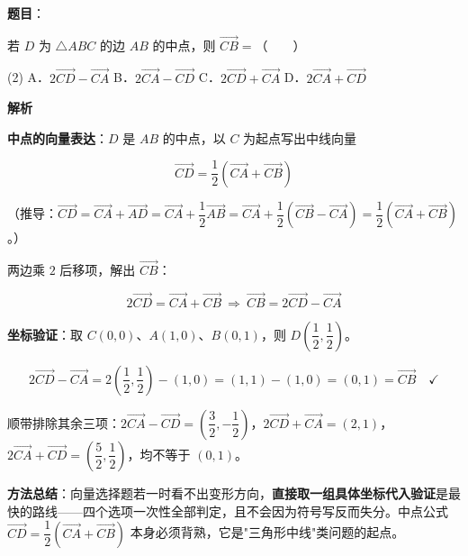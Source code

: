 \begin{answer}

\textbf{题目}：

若 $D$ 为 $\triangle ABC$ 的边 $AB$ 的中点，则 $\overrightarrow{CB}=$\mbox{（　　）}

\begin{gkopts}(2)
\task A．$2\overrightarrow{CD}-\overrightarrow{CA}$
\task B．$2\overrightarrow{CA}-\overrightarrow{CD}$
\task C．$2\overrightarrow{CD}+\overrightarrow{CA}$
\task D．$2\overrightarrow{CA}+\overrightarrow{CD}$
\end{gkopts}

\textbf{解析}

\textbf{中点的向量表达}：$D$ 是 $AB$ 的中点，以 $C$ 为起点写出中线向量

\nopagebreak[4]
\[\overrightarrow{CD}=\frac12\left(\overrightarrow{CA}+\overrightarrow{CB}\right)\]

（推导：$\overrightarrow{CD}=\overrightarrow{CA}+\overrightarrow{AD}=\overrightarrow{CA}+\dfrac12\overrightarrow{AB}=\overrightarrow{CA}+\dfrac12\left(\overrightarrow{CB}-\overrightarrow{CA}\right)=\dfrac12\left(\overrightarrow{CA}+\overrightarrow{CB}\right)$。）

两边乘 $2$ 后移项，解出 $\overrightarrow{CB}$：

\nopagebreak[4]
\[2\overrightarrow{CD}=\overrightarrow{CA}+\overrightarrow{CB}\ \Longrightarrow\ \overrightarrow{CB}=2\overrightarrow{CD}-\overrightarrow{CA}\]

\textbf{坐标验证}：取 $C(0,0)$、$A(1,0)$、$B(0,1)$，则 $D\left(\dfrac12,\dfrac12\right)$。

\nopagebreak[4]
\[2\overrightarrow{CD}-\overrightarrow{CA}=2\left(\frac12,\frac12\right)-(1,0)=(1,1)-(1,0)=(0,1)=\overrightarrow{CB}\quad\checkmark\]

顺带排除其余三项：$2\overrightarrow{CA}-\overrightarrow{CD}=\left(\dfrac32,-\dfrac12\right)$，$2\overrightarrow{CD}+\overrightarrow{CA}=(2,1)$，$2\overrightarrow{CA}+\overrightarrow{CD}=\left(\dfrac52,\dfrac12\right)$，均不等于 $(0,1)$。

\begin{gktip}
\textbf{方法总结}：向量选择题若一时看不出变形方向，\textbf{直接取一组具体坐标代入验证}是最快的路线——四个选项一次性全部判定，且不会因为符号写反而失分。中点公式 $\overrightarrow{CD}=\dfrac12\left(\overrightarrow{CA}+\overrightarrow{CB}\right)$ 本身必须背熟，它是"三角形中线"类问题的起点。
\end{gktip}


\par\medskip

\end{answer}
